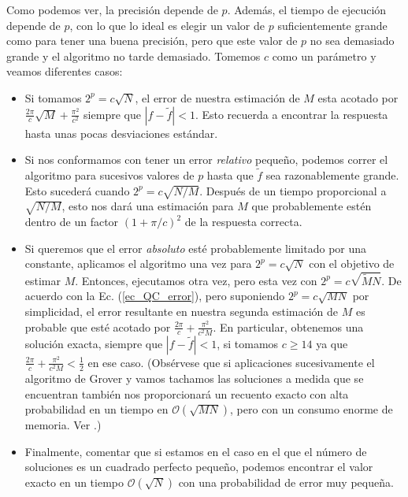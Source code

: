 \documentclass[a4paper,11pt]{article} %
\numberwithin{equation}{section}
\begin{document}
Como podemos ver, la precisión depende de $p$. Además, el tiempo de ejecución depende de $p$, con lo que lo ideal es elegir un valor de $p$ suficientemente grande como para tener una buena precisión, pero que este valor de $p$ no sea demasiado grande y el algoritmo no tarde demasiado. Tomemos $c$ como un parámetro y veamos diferentes casos:
\begin{itemize}
	\item Si tomamos $2^p = c \sqrt{N}$, el error de nuestra estimación de $M$ esta acotado por $\frac{2 \pi}{c} \sqrt{M} + \frac{\pi^2}{c^2}$ siempre que $|f - \tilde{f}| < 1$. Esto recuerda a encontrar la respuesta hasta unas pocas desviaciones estándar. 
	
	\item Si nos conformamos con tener un error \textit{relativo} pequeño, podemos correr el algoritmo para sucesivos valores de $p$ hasta que $\tilde{f}$ sea razonablemente grande. Esto sucederá cuando $2^p = c \sqrt{N/M}$. Después de un tiempo proporcional a $\sqrt{N/M}$, esto nos dará una estimación para $M$ que probablemente estén dentro de un factor $(1+ \pi/c)^2$ de la respuesta correcta. 
	
	\item Si queremos que el error \textit{absoluto} esté probablemente limitado por una constante, aplicamos el algoritmo una vez para $2^p = c \sqrt{N}$ con el objetivo de estimar $M$. Entonces, ejecutamos otra vez, pero esta vez con $2^p = c \sqrt{\tilde{M}N}$. De acuerdo con la Ec. (\ref{ec_QC_error}), pero suponiendo $2^p = c \sqrt{MN}$ por simplicidad, el error resultante en nuestra segunda estimación de $M$ es probable que esté acotado por $\frac{2 \pi}{c} + \frac{\pi^2}{c^2 M}$. En particular, obtenemos una solución exacta, siempre que $|f - \tilde{f}| < 1$, si tomamos $c \geq 14$ ya que $\frac{2 \pi}{c} + \frac{\pi^2}{c^2 M} < \frac{1}{2}$ en ese caso. (Obsérvese que si aplicaciones sucesivamente el algoritmo de Grover y vamos tachamos las soluciones a medida que se encuentran también nos proporcionará un recuento exacto con alta probabilidad en un tiempo en $\mathcal{O} (\sqrt{M N})$, pero con un consumo enorme de memoria. Ver \cite{Approximate_QC}.)
	
	\item Finalmente, comentar que si estamos en el caso en el que el número de soluciones es un cuadrado perfecto pequeño, podemos encontrar el valor  exacto en un tiempo $\mathcal{O}(\sqrt{N})$ con una probabilidad de error muy pequeña. 
	
\end{itemize}
\end{document}
